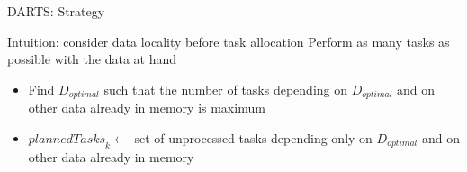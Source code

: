 \documentclass{libs/ufc_format}
\newcommand{\GPU}[1]{\ensuremath{\mathrm{GPU}_{#1}}\xspace}
\newcommand{\Dtouse}[1]{\ensuremath{\mathit{dataNotInMem}_{#1}}\xspace}
\newcommand{\plannedTasks}[1]{\ensuremath{\mathit{plannedTasks}_{#1}}\xspace}
\newcommand{\Dopt}{\ensuremath{D_{\mathit{opt}}}\xspace}
\newcommand{\Treturned}{\ensuremath{T}\xspace}
\newcommand{\pulledTasks}[1]{\ensuremath{\mathit{taskBuffer}_{#1}}\xspace}
\begin{document}

\begin{frame}{DARTS: Strategy}
	\begin{alertblock}{Intuition: consider data locality before task allocation}
		Perform as many tasks as possible with the data at hand
	\end{alertblock}
	\begin{alertblock}{}
		\begin{itemize}
			\item Find $D_{optimal}$ such that the number of tasks depending on $D_{optimal}$ and on other data already in memory is maximum
			\item $\plannedTasks{k} \gets$ set of unprocessed tasks depending only on $D_{optimal}$ and on other data already in memory 
		\end{itemize}
	\end{alertblock}
\end{frame}
\end{document}
